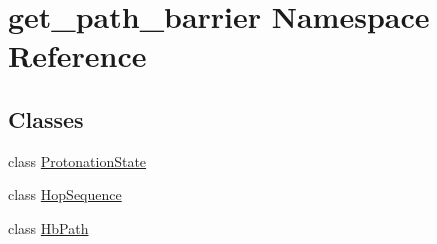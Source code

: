 \hypertarget{namespaceget__path__barrier}{\section{get\-\_\-path\-\_\-barrier Namespace Reference}
\label{namespaceget__path__barrier}
}
\subsection*{Classes}
\begin{DoxyCompactItemize}
\item 
class \hyperlink{classget__path__barrier_1_1_protonation_state}{Protonation\-State}
\item 
class \hyperlink{classget__path__barrier_1_1_hop_sequence}{Hop\-Sequence}
\item 
class \hyperlink{classget__path__barrier_1_1_hb_path}{Hb\-Path}
\end{DoxyCompactItemize}
